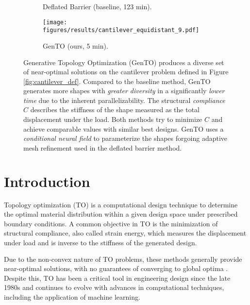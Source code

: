     \begin{figure}[ht!]
        \centering
        \begin{subfigure}{0.48\textwidth}
            \centering
            \caption{Deflated Barrier (baseline, 123 min).}
            \label{fig:cantilever_db}
        \end{subfigure}
        \hfill %
        \begin{subfigure}{0.48\textwidth}
            \centering
            \texttt{[image: figures/results/cantilever\_equidistant\_9.pdf]}
            \caption{GenTO (ours, 5 min).}
            \label{fig:cantilever_GenTO}
        \end{subfigure}
        
        \caption{Generative Topology Optimization (GenTO) produces a diverse set of near-optimal solutions on the cantilever problem defined in Figure \ref{fig:cantilever_def}.
        Compared to the baseline method, GenTO generates more shapes with \emph{greater diversity} in a significantly \emph{lower time} due to the inherent parallelizability.
        The structural \emph{compliance} $C$ describes the stiffness of the shape measured as the total displacement under the load.
        Both methods try to minimize $C$ and achieve comparable values with similar best designs.
        GenTO uses a \emph{conditional neural field} to parameterize the shapes forgoing adaptive mesh refinement used in the deflated barrier method.}
        \label{fig:results_cantilever}
    \end{figure}

\fi



\section{Introduction}

Topology optimization (TO) is a computational design technique to determine the optimal material distribution within a given design space under prescribed boundary conditions. 
A common objective in TO is the minimization of structural compliance, also called strain energy, which measures the displacement under load and is inverse to the stiffness of the generated design.

Due to the non-convex nature of TO problems, these methods generally provide near-optimal solutions, with no guarantees of converging to global optima \citep{allaire2021shape}.
Despite this, TO has been a critical tool in engineering design since the late 1980s and continues to evolve with advances in computational techniques, including the application of machine learning.

